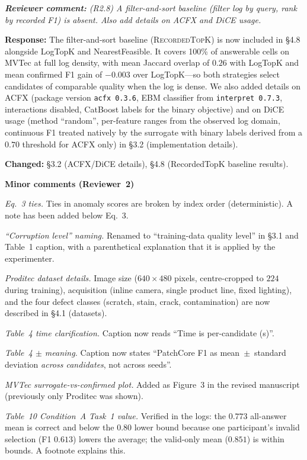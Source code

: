 \documentclass[11pt,a4paper]{article}
\newcommand{\revquote}[1]{\smallskip\noindent\textit{\textbf{Reviewer comment:} #1}\smallskip}
\newcommand{\response}[1]{\noindent\textbf{Response:} #1\par}
\begin{document}
\bigskip

\revquote{(R2.8) A filter-and-sort baseline (filter log by query, rank by
recorded F1) is absent. Also add details on ACFX and DiCE usage.}

\response{The filter-and-sort baseline (\textsc{RecordedTopK}) is now
included in \S4.8 alongside LogTopK and NearestFeasible. It covers
100\% of answerable cells on MVTec at full log density, with mean
Jaccard overlap of $0.26$ with LogTopK and mean confirmed F1 gain of
$-0.003$ over LogTopK---so both strategies select candidates of
comparable quality when the log is dense. We also added details on ACFX
(package version \texttt{acfx 0.3.6}, EBM classifier from
\texttt{interpret 0.7.3}, interactions disabled, CatBoost labels for
the binary objective) and on DiCE usage (method ``random'', per-feature
ranges from the observed log domain, continuous F1 treated natively by
the surrogate with binary labels derived from a $0.70$ threshold for
ACFX only) in \S3.2 (implementation details).

\noindent\textbf{Changed:} \S3.2 (ACFX/DiCE details), \S4.8
(RecordedTopK baseline results).}

\bigskip
\noindent\textbf{Minor comments (Reviewer~2)}

\smallskip
\noindent\textit{Eq.~3 ties.} Ties in anomaly scores are broken by
index order (deterministic). A note has been added below Eq.~3.

\noindent\textit{``Corruption level'' naming.} Renamed to
``training-data quality level'' in \S3.1 and Table~1 caption, with
a parenthetical explanation that it is applied by the experimenter.

\noindent\textit{Proditec dataset details.} Image size ($640 \times 480$
pixels, centre-cropped to $224$ during training), acquisition (inline
camera, single product line, fixed lighting), and the four defect
classes (scratch, stain, crack, contamination) are now described in
\S4.1 (datasets).

\noindent\textit{Table~4 time clarification.} Caption now reads ``Time is
per-candidate (s)''.

\noindent\textit{Table~4 $\pm$ meaning.} Caption now states ``PatchCore
F1 as mean~$\pm$~standard deviation \emph{across candidates}, not
across seeds''.

\noindent\textit{MVTec surrogate-vs-confirmed plot.} Added as
Figure~3 in the revised manuscript (previously only Proditec was shown).

\noindent\textit{Table~10 Condition~A Task~1 value.} Verified in the
logs: the $0.773$ all-answer mean is correct and below the $0.80$
lower bound because one participant's invalid selection (F1 $0.613$)
lowers the average; the valid-only mean ($0.851$) is within bounds.
A footnote explains this.
\end{document}
